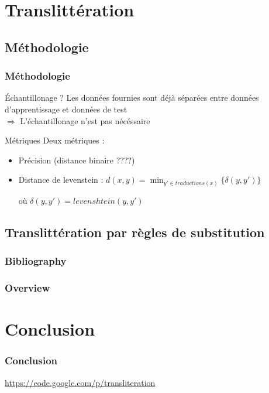 \documentclass{beamer}
\begin{document}
\section{Translittération}

\subsection{Méthodologie}

\begin{frame}
\frametitle{Méthodologie}

	\begin{block}{Échantillonage ?}
	Les données fournies sont déjà séparées entre données d'apprentissage et données de test\\
	$\Longrightarrow$ L'échantillonage n'est pas nécéssaire
	\end{block}

	\begin{block}{Métriques}
	Deux métriques  :
		\begin{itemize}
		\item Précision (distance binaire ????)
		\item Distance de levenstein : $d(x,y) = \min_{y' \in traductions(x)} \{\delta(y,y')\}$

où $\delta(y,y')=levenshtein(y,y')$
		\end{itemize}		
	\end{block}
\end{frame}

\subsection{Translittération par règles de substitution}



\begin{frame}
    \frametitle{Bibliography}
    {\fontsize{0.8em}{1em}
    \nocite{*}
    
    }
\end{frame}

\begin{frame}
    \frametitle{Overview}
\end{frame}

\section{Conclusion}
\begin{frame}
    \frametitle{Conclusion}
    \url{https://code.google.com/p/transliteration}
\end{frame}
\end{document}
